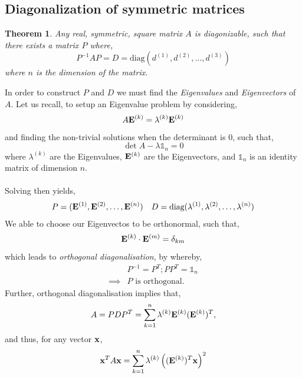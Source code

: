 \documentclass{book}
\newtheorem*{theorem}{Theorem}
\begin{document}
\subsection{Diagonalization of symmetric matrices}
\begin{theorem}
    Any real, symmetric, square matrix $A$ is diagonizable, such that there exists a matrix $P$ where,
    \begin{equation}
        P^{-1}AP = D = \text{diag}\left(d^{(1)},d^{(2)},\ldots,d^{(3)}\right)
    \end{equation}
    where $n$ is the dimension of the matrix.
\end{theorem}
In order to construct $P$ and $D$ we must find the \textit{Eigenvalues} and \textit{Eigenvectors} of $A$. Let us recall, to setup an Eigenvalue problem by considering,
\begin{equation}
    A\vb{E}^{(k)} = \lambda^{(k)}\vb{E}^{(k)}
\end{equation}
and finding the non-trivial solutions when the determinant is 0, such that,
\begin{equation}
    \det{A - \lambda\mathbb{1}_n} = 0
\end{equation}
where $\lambda^{(k)}$ are the Eigenvalues, $\vb{E}^{(k)}$ are the Eigenvectors, and $\mathbb{1}_n$ is an identity matrix of dimension $n$.
\\\\
Solving then yields,
\begin{align}
    P=(\vb{E}^{(1)},\vb{E}^{(2)},\ldots,\vb{E}^{(n)}) && D = \text{diag}(\lambda^{(1)},\lambda^{(2)},\ldots,\lambda^{(n)})
\end{align}
We able to choose our Eigenvectos to be orthonormal, such that,
\begin{equation}
    \vb{E}^{(k)}\cdot\vb{E}^{(m)} = \delta_{km}
\end{equation}
which leads to \textit{orthogonal diagonalisation}, by whereby,
\begin{equation}
    \begin{split}
        &P^{-1}=P^T; PP^T=\mathbb{1}_n \\
        \implies&\text{$P$ is orthogonal}.
    \end{split}
\end{equation}
Further, orthogonal diagonalisation implies that,
\begin{equation}
    A = PDP^T = \sum_{k=1}^n \lambda^{(k)}\vb{E}^{(k)}(\vb{E}^{(k)})^T,
\end{equation}
and thus, for any vector $\vb{x}$, 
\begin{equation}
    \vb{x}^{T}A\vb{x} = \sum_{k=1}^n\lambda^{(k)}\left((\vb{E}^{(k)})^T\vb{x}\right)^2 \label{vectordiagonlisation}
\end{equation}
\end{document}

